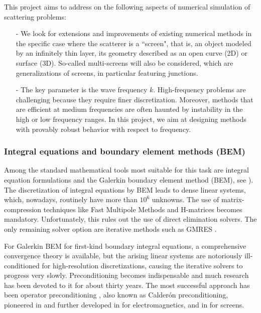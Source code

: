 \documentclass[]{report}
\begin{document}
This project aims to address on the following aspects of numerical simulation of
scattering problems:
\begin{itemize}
\item[-] We look for extensions and improvements of existing numerical methods in the
  specific case where the scatterer is a ``screen", that is, an object modeled by an
  infinitely thin layer, its geometry described as an open curve (2D) or surface
  (3D). So-called multi-screens will also be considered, which are generalizations of
  screens, in particular featuring junctions.
\item[-] The key parameter is the wave frequency $k$. High-frequency problems are
  challenging because they require finer discretization. Moreover, methods that are
  efficient at medium frequencies are often haunted by instability in the high or low
  frequency ranges. In this project, we aim at designing methods with provably robust
  behavior with respect to frequency.
\end{itemize}

\subsubsection*{Integral equations and boundary element methods (BEM)}

Among the standard mathematical tools most suitable for this task are integral equation
formulations and the Galerkin boundary element method (BEM), see
\cite{mclean2000strongly,sauter2010boundary}). The discretization of integral equations by
BEM leads to dense linear systems, which, nowadays, routinely have more than $10^6$
unknowns. The use of matrix-compression techniques like Fast Multipole Methods
\cite{greengard1987fast} and H-matrices \cite{hackbusch1999sparse} becomes mandatory.
Unfortunately, this rules out the use of direct elimination solvers. The only remaining
solver option are iterative methods such as GMRES \cite{saad1986gmres}.

For Galerkin BEM for first-kind boundary integral equations, a comprehensive convergence
theory is available, but the arising linear systems are notoriously ill-conditioned for
high-resolution discretizations, causing the iterative solvers to progress very
slowly. Preconditioning becomes indispensable and much research has been devoted to it for
about thirty years. The most successful approach has been operator preconditioning
\cite{hiptmair2006operator2}, also known as Calder\'on preconditioning, pioneered in
\cite{steinbach1998construction} and further developed in \cite{BUC07ACB08} for
electromagnetics, and in \cite{hiptmair2020optimal} for screens. 
\end{document}
